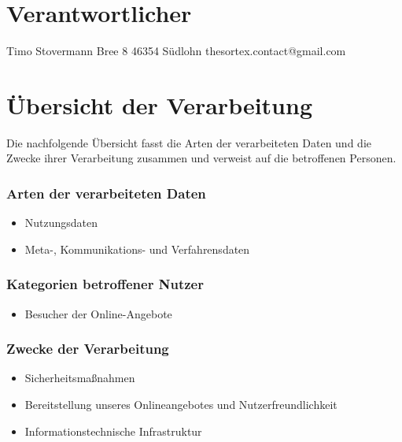 \documentclass[12pt]{article}
\begin{document}
\part{Verantwortlicher}
Timo Stovermann
Bree 8
46354 Südlohn
thesortex.contact@gmail.com

\part{Übersicht der Verarbeitung}
Die nachfolgende Übersicht fasst die Arten der verarbeiteten Daten und die Zwecke ihrer Verarbeitung zusammen und verweist auf die betroffenen Personen.
\section*{Arten der verarbeiteten Daten}
\begin{itemize}
\item Nutzungsdaten
\item Meta-, Kommunikations- und Verfahrensdaten
\end{itemize}
\section*{Kategorien betroffener Nutzer}
\begin{itemize}
\item Besucher der Online-Angebote
\end{itemize}
\section*{Zwecke der Verarbeitung}
\begin{itemize}
\item Sicherheitsmaßnahmen
\item Bereitstellung unseres Onlineangebotes und Nutzerfreundlichkeit
\item Informationstechnische Infrastruktur
\end{itemize}
\end{document}
